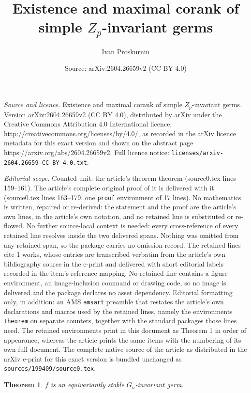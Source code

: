 \documentclass[10pt,a4paper]{amsart}
\title{Existence and maximal corank of simple $Z_p$-invariant germs}
\author{Ivan Proskurnin}
\date{Source: arXiv:2604.26659v2 (CC BY 4.0)}
\newtheorem{theorem}{Theorem}
\begin{document}
\maketitle

\noindent\emph{Source and licence.} Existence and maximal corank of simple $Z_p$-invariant germs. Version arXiv:2604.26659v2 (CC BY 4.0), distributed by arXiv under the Creative Commons Attribution 4.0 International licence, http://creativecommons.org/licenses/by/4.0/, as recorded in the arXiv licence metadata for this exact version and shown on the abstract page https://arxiv.org/abs/2604.26659v2. Full licence notice: \texttt{licenses/arxiv-2604.26659-CC-BY-4.0.txt}.\par\smallskip

\noindent\textit{Editorial scope.} Counted unit: the article's theorem theorem (source0.tex lines 159--161). The article's complete original proof of it is delivered with it (source0.tex lines 163--179, one \texttt{proof} environment of 17 lines). No mathematics is written, repaired or re-derived: the statement and the proof are the article's own lines, in the article's own notation, and no retained line is substituted or re-flowed.  No further source-local context is needed: every cross-reference of every retained line resolves inside the two delivered spans.  Nothing was omitted from any retained span, so the package carries no omission record.  The retained lines cite 1 works, whose entries are transcribed verbatim from the article's own bibliography source in the e-print and delivered with short editorial labels recorded in the item's reference mapping.  No retained line contains a figure environment, an image-inclusion command or drawing code, so no image is delivered and the package declares no asset dependency.  Editorial formatting only, in addition: an AMS \texttt{amsart} preamble that restates the article's own declarations and macros used by the retained lines, namely the environments \texttt{theorem} on separate counters, together with the standard packages those lines need.  The retained environments print in this document as Theorem 1 in order of appearance, whereas the article prints the same items with the numbering of its own full document.  The complete native source of the article as distributed in the arXiv e-print for this exact version is bundled unchanged as \texttt{sources/199409/source0.tex}.
\begin{theorem}
$f$ is an equivariantly stable $G_n$-invariant germ.
\end{theorem}
\end{document}
